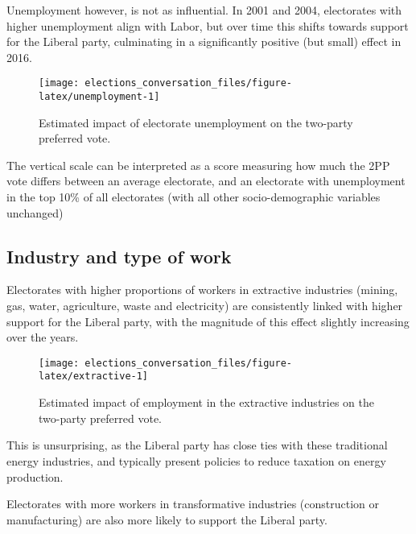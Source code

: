 \documentclass[11pt,a4paper,]{article}
\begin{document}
Unemployment however, is not as influential. In 2001 and 2004, electorates with higher unemployment align with Labor, but over time this shifts towards support for the Liberal party, culminating in a significantly positive (but small) effect in 2016.

\begin{figure}[H]

{\centering \texttt{[image: elections\_conversation\_files/figure-latex/unemployment-1]} 

}

\caption{Estimated impact of electorate unemployment on the two-party preferred vote.}\label{fig:unemployment}
\end{figure}

The vertical scale can be interpreted as a score measuring how much the 2PP vote differs between an average electorate, and an electorate with unemployment in the top 10\% of all electorates (with all other socio-demographic variables unchanged)

\hypertarget{industry-and-type-of-work}{%
\subsection*{Industry and type of work}\label{industry-and-type-of-work}}

Electorates with higher proportions of workers in extractive industries (mining, gas, water, agriculture, waste and electricity) are consistently linked with higher support for the Liberal party, with the magnitude of this effect slightly increasing over the years.

\begin{figure}[H]

{\centering \texttt{[image: elections\_conversation\_files/figure-latex/extractive-1]} 

}

\caption{Estimated impact of employment in the extractive industries on the two-party preferred vote.}\label{fig:extractive}
\end{figure}

This is unsurprising, as the Liberal party has close ties with these traditional energy industries, and typically present policies to reduce taxation on energy production.

Electorates with more workers in transformative industries (construction or manufacturing) are also more likely to support the Liberal party.
\end{document}
